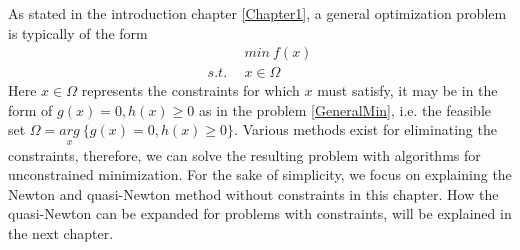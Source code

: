 \documentclass  [
  paper    = a4,
  BCOR     = 10mm,
  twoside,
  fontsize = 12pt,
  fleqn,
  toc      = bibnumbered,
  toc      = listofnumbered,
  numbers  = noendperiod,
  headings = normal,
  listof   = leveldown,
  version  = 3.03
]                                       {scrreprt}
\newcommand{\<}{\langle}
\renewcommand{\>}{\rangle}
\begin{document}
   As stated in the introduction chapter \ref{Chapter1}, a general optimization problem is typically of the form 
   \begin{equation}
   \begin{aligned}
   \  \  \ & min \  f(x) \\
   s.t.\ \  & x \in \Omega
   \end{aligned}
   \label{OptGen}
   \end{equation}
   Here $x \in \Omega$ represents the constraints for which $x$ must satisfy, it may be in the form of $ g(x) = 0,  h(x)  \geq  0$ as in the problem \ref{GeneralMin}, i.e. the feasible set $\Omega = \underset{x}{arg} \ \{ g(x) = 0,  h(x)  \geq  0 \}$. Various methods exist for eliminating the constraints, therefore, we can solve the resulting problem with algorithms for unconstrained minimization. For the sake of simplicity, we focus on explaining the Newton and quasi-Newton method without constraints in this chapter. How the quasi-Newton can be expanded for problems with constraints, will be explained in the next chapter. 
   
   
\end{document}
